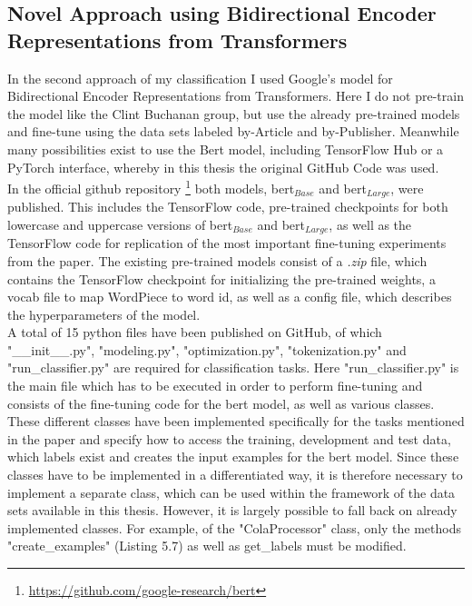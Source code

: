 \documentclass[a4paper, 11pt,titlepage,oneside,openany]{book}
\begin{document}
\subsection{Novel Approach using Bidirectional Encoder Representations from Transformers}
In the second approach of my classification I used Google's model for Bidirectional Encoder Representations from Transformers. Here I do not pre-train the model like the Clint Buchanan group, but use the already pre-trained models and fine-tune using the data sets labeled by-Article and by-Publisher. Meanwhile many possibilities exist to use the Bert model, including TensorFlow Hub \cite{tensorflow} or a PyTorch \cite{pytorch} interface, whereby in this thesis the original GitHub Code was used.\\
\indent In the official github repository \footnote{\url{https://github.com/google-research/bert}}  both models, \gls{bert}$_{Base}$ and \gls{bert}$_{Large}$, were published. This includes the TensorFlow code, pre-trained checkpoints for both lowercase and uppercase versions of \gls{bert}$_{Base}$ and \gls{bert}$_{Large}$, as well as the TensorFlow code for replication of the most important fine-tuning experiments from the paper. The existing pre-trained models consist of a \textit{.zip} file, which contains the TensorFlow checkpoint for initializing the pre-trained weights, a vocab file to map WordPiece to word id, as well as a config file, which describes the hyperparameters of the model. \\ 
\indent A total of 15 python files have been published on GitHub, of which "\_\_init\_\_.py", "modeling.py", "optimization.py", "tokenization.py" and "run\_classifier.py" are required for classification tasks. Here "run\_classifier.py" is the main file which has to be executed in order to perform fine-tuning and consists of the fine-tuning code for the \gls{bert} model, as well as various classes. \newpage \noindent These different classes have been implemented specifically for the tasks mentioned in the paper and specify how to access the training, development and test data, which labels exist and creates the input examples for the \gls{bert} model. Since these classes have to be implemented in a differentiated way, it is therefore necessary to implement a separate class, which can be used within the framework of the data sets available in this thesis. However, it is largely possible to fall back on already implemented classes. For example, of the "ColaProcessor" class, only the methods "create\_examples" (Listing 5.7) as well as get\_labels must be modified. 
\end{document}

